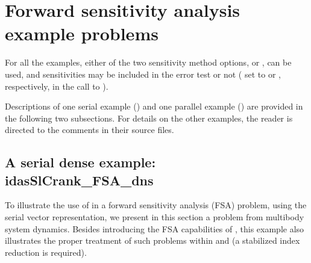 \section{Forward sensitivity analysis example problems}\label{s:fwd_ex}

For all the {\idas} examples, either of the two sensitivity method options,
 or , can be used, 
and sensitivities may be included in the error test or not 
( set to  or , respectively, in the
call to ).

Descriptions of one serial example () and
one parallel example () are provided
in the following two subsections.  For details on the other examples,
the reader is directed to the comments in their source files.



\subsection{A serial dense example: idasSlCrank\_FSA\_dns}
\label{ss:idasSlCrank_FSA_dns}
To illustrate the use of {\idas} in a forward sensitivity analysis (FSA) problem, using
the serial vector representation, we present in this section a problem from
multibody system dynamics. Besides introducing the FSA capabilities of {\idas},
this example also illustrates the proper treatment of such problems within {\ida} and {\idas}
(a stabilized index reduction is required). 


